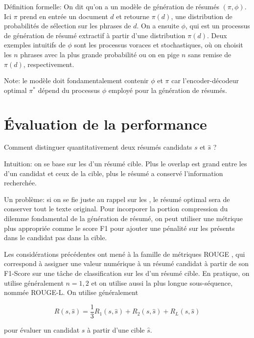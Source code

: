 Définition formelle: On dit qu'on a un modèle de génération de résumés
$(\pi, \phi)$.
Ici $\pi$ prend en entrée un document $d$ et retourne
$\pi(d)$, une distribution de probabilités de sélection sur les phrases
de $d$. On a ensuite $\phi$, qui est un processus de génération de résumé
extractif à partir d'une distribution $\pi(d)$.
Deux exemples intuitifs de $\phi$ sont les processus voraces et stochastiques,
où on choisit les $n$ phrases avec la plus grande probabilité ou on en pige
$n$ sans remise de $\pi(d)$, respectivement.

Note: le modèle doit fondamentalement contenir $\phi$ et $\pi$ car
l'encoder-décodeur optimal $\pi^*$ dépend du processus $\phi$ employé
pour la génération de résumés.

\section{Évaluation de la performance}

Comment distinguer quantitativement deux résumés candidats $s$ et $\hat{s}$ ?

Intuition: on se base sur les \ngrams d'un résumé cible. Plus le overlap
est grand entre les \ngrams d'un candidat et ceux de la cible, plus le résumé
a conservé l'information recherchée.

Un problème: si on se fie juste au rappel sur les \ngrams, le résumé optimal sera
de conserver tout le texte original. Pour incorporer la portion compression du dilemme
fondamental de la génération de résumé, on peut utiliser une métrique plus
appropriée comme le score F1 pour ajouter une pénalité sur les \ngrams présents dans
le candidat pas dans la cible.

Les considérations précédentes ont mené à la famille de métriques ROUGE \citep{lin-2004-rouge},
qui correspond à assigner une valeur numérique à un résumé candidat à partir
de son F1-Score sur une tâche de classification sur les \ngrams d'un résumé cible.
En pratique, on utilise généralement $n={1,2}$ et on utilise aussi la plus longue
sous-séquence, nommée ROUGE-L. On utilise généralement

\begin{equation}
    \label{eq:ROUGE}
    R(s, \hat{s}) = \frac{1}{3} R_1(s, \hat{s}) + R_2(s, \hat{s}) + R_L(s, \hat{s})
\end{equation}

pour évaluer un candidat $s$ à partir d'une cible $\hat{s}$.


